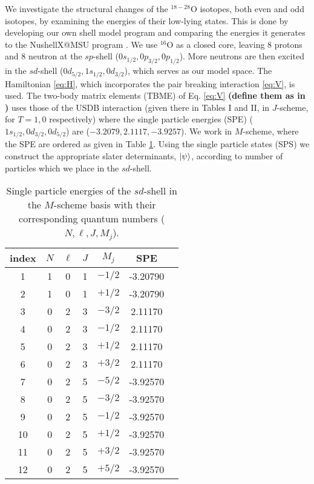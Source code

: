 \documentclass[aps,prl,reprint,groupedaddress]{revtex4-1}  %
\begin{document}
We investigate the structural changes of the $^{18-28}$O isotopes, both even and odd isotopes, by examining the energies of their low-lying states. This is done by developing our own shell model program and comparing the energies it generates to the NushellX@MSU program \cite{Brown2014}. We use $^{16}$O as a closed core, leaving 8 protons and 8 neutron at the $sp$-shell ($0s_{1/2},0p_{3/2},0p_{1/2}$). More neutrons are then excited in the $sd$-shell ($0d_{5/2},1s_{1/2},0d_{3/2}$), which serves as our model space. The Hamiltonian \eqref{eq:H}, which incorporates the pair breaking interaction \eqref{eq:V}, is used. The two-body matrix elements (TBME) of Eq. \eqref{eq:V} \textbf{(define them as in \cite{Brown2006})} uses those of the USDB interaction \cite{Brown2006} (given there in Tables I and II, in $J$-scheme, for $T=1,0$ respectively) where the single particle energies (SPE) ($1s_{1/2},0d_{3/2},0d_{5/2}$) are ($-3.2079, 2.1117, -3.9257$). We work in $M$-scheme, where the SPE are ordered as given in Table \ref{tab:SPE}. Using the single particle states (SPS) we construct the appropriate slater determinants, $\ket{\psi}$, according to number of particles which we place in the $sd$-shell.

\begin{table}[h]
\caption{Single particle energies of the $sd$-shell in the $M$-scheme basis with their corresponding quantum numbers ($N,\ell,J,M_j$). \label{tab:SPE}}
\begin{ruledtabular}
\begin{tabular}{c|cccccc}
index	&	$N$	&	$\ell$	&	$J$	&	$M_j$	&	SPE			\\
\hline 
1		&	1	&	0		&	1	&	$-1/2$	&	-3.20790	\\
2		&	1	&	0		&	1	&	$+1/2$	&	-3.20790	\\
3		& 	0	&	2		&	3	&	$-3/2$	&	 2.11170	\\
4		&	0	&	2		&	3	&	$-1/2$	&	 2.11170	\\
5		&	0	&	2		&	3	&	$+1/2$	&	 2.11170	\\
6		&	0	&	2		&	3	&	$+3/2$	&	 2.11170	\\
7		&	0	&	2		&	5	&	$-5/2$	&	-3.92570	\\
8		&	0	&	2		&	5	&	$-3/2$	&	-3.92570	\\
9		&	0	&	2		&	5	&	$-1/2$	&	-3.92570	\\
10		&	0	&	2		&	5	&	$+1/2$	&	-3.92570	\\
11		&	0	&	2		&	5	&	$+3/2$	&	-3.92570	\\
12		&	0	&	2		&	5	&	$+5/2$	&	-3.92570	\\
\end{tabular}
\end{ruledtabular}
\end{table}
\end{document}
